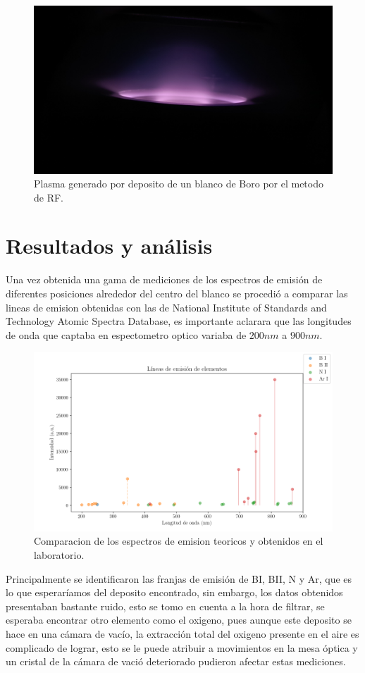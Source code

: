 \documentclass[12pt]{IEEEtran}
\begin{document}
\begin{figure}[htp]
	\centering
	\includegraphics[width=0.8\linewidth]{PLASMA.jpg}
	\caption{Plasma generado por deposito de un blanco de Boro por el metodo de RF.}
	\label{fig:plasma}
\end{figure}

\section{Resultados y análisis}

Una vez obtenida una gama de mediciones de los espectros de emisión  de diferentes posiciones alrededor del centro del blanco se procedió a comparar las lineas de emision obtenidas con las de National Institute of Standards and Technology Atomic Spectra Database, es importante aclarara que las longitudes de onda que captaba en espectometro optico variaba de $200 nm $ a $900 nm$.

\begin{figure}[htp]
	\centering
	\includegraphics[width=0.9\linewidth]{descarga.png}
	\caption{Comparacion de los espectros de emision teoricos y obtenidos en el laboratorio.}
	\label{Graf:plasma}
\end{figure}

Principalmente se identificaron las franjas de emisión de BI, BII, N y Ar, que es lo que esperaríamos del deposito encontrado, sin embargo, los datos obtenidos presentaban bastante ruido, esto se tomo en cuenta a la hora de filtrar, se esperaba encontrar otro elemento como el oxigeno, pues aunque este deposito se hace en una cámara de vacío, la extracción total del oxigeno presente en el aire es complicado de lograr, esto se le puede atribuir a movimientos en la mesa óptica y un cristal de la cámara de vació deteriorado pudieron afectar estas mediciones.
\end{document}

